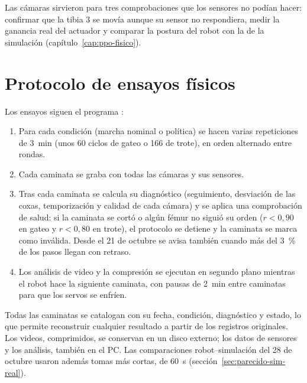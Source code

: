 Las cámaras sirvieron para tres comprobaciones que los sensores no podían hacer:
confirmar que la tibia 3 se movía aunque su sensor no respondiera, medir la
ganancia real del actuador y comparar la postura del robot con la de la
simulación (capítulo~\ref{cap:ppo-fisico}).

\section{Protocolo de ensayos físicos}
\label{sec:protocolo-fisico}

Los ensayos siguen el programa :
\begin{enumerate}
    \item Para cada condición (marcha nominal o política) se hacen varias
    repeticiones de 3~min (unos 60 ciclos de gateo o 166 de trote), en orden
    alternado entre rondas.
    \item Cada caminata se graba con todas las cámaras y sus sensores.
    \item Tras cada caminata se calcula su diagnóstico (seguimiento, desviación
    de las coxas, temporización y calidad de cada cámara) y se aplica una
    comprobación de salud: si la caminata se cortó o algún fémur no siguió su
    orden ($r<0{,}90$ en gateo y $r<0{,}80$ en trote), el protocolo se detiene y
    la caminata se marca como inválida. Desde el 21 de octubre se avisa también
    cuando más del 3~\% de los pasos llegan con retraso.
    \item Los análisis de video y la compresión se ejecutan en segundo plano
    mientras el robot hace la siguiente caminata, con pausas de 2~min entre
    caminatas para que los servos se enfríen.
\end{enumerate}
Todas las caminatas se catalogan con su fecha, condición, diagnóstico y estado,
lo que permite reconstruir cualquier resultado a partir de los registros
originales. Los videos, comprimidos, se conservan en un disco externo; los datos de
sensores y los análisis, también en el PC. Las comparaciones robot--simulación del 28
de octubre usaron además tomas más cortas, de 60~s
(sección~\ref{sec:parecido-sim-real}).
